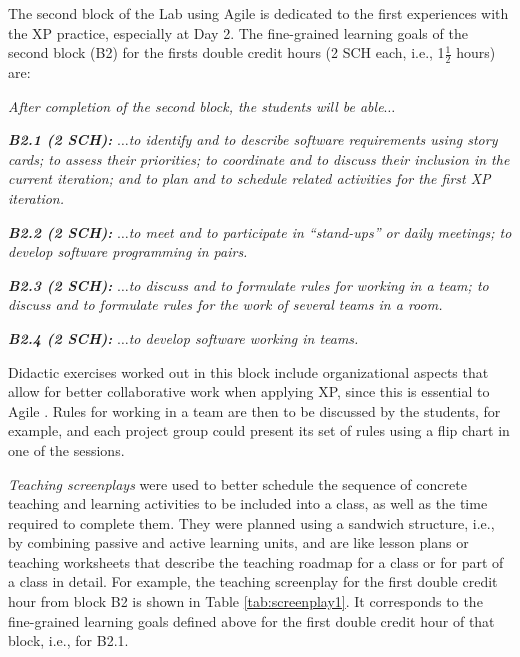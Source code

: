 \documentclass[conference]{IEEEtran}
\begin{document}
The second block of the Lab using Agile is dedicated to the first experiences with the XP practice, especially at Day 2. The fine-grained learning goals of the second block (B2) for the firsts double credit hours (2 SCH each, i.e., 1$\frac{1}{2}$ hours) are: 

\textit{After completion of the second block, the students will be able$\dots$ }

\textit{\bfseries B2.1 (2 SCH):} $\dots$\textit{to identify and to describe software requirements using story cards; to assess their priorities; to coordinate and to discuss their inclusion in the current iteration; and to plan and to schedule related activities for the first XP iteration.}

\textit{\bfseries B2.2 (2 SCH):} $\dots$\textit{to meet and to participate in ``stand-ups'' or daily meetings; to develop software programming in pairs.}

\textit{\bfseries B2.3 (2 SCH):} $\dots$\textit{to discuss and to formulate rules for working in a team; to discuss and to formulate rules for the work of several teams in a room.}

\textit{\bfseries B2.4 (2 SCH):} $\dots$\textit{to develop software working in teams.}

Didactic exercises worked out in this block include organizational aspects that allow for better collaborative work when applying XP, since this is essential to Agile \cite{Beetal01}. Rules for working in a team are then to be discussed by the students, for example, and each project group could present its set of rules using a flip chart in one of the sessions.

\textit{Teaching screenplays} were used to better schedule the sequence of concrete teaching and learning activities to be included into a class, as well as the time required to complete them. They were planned using a sandwich structure, i.e., by combining passive and active learning units, and are like lesson plans or teaching worksheets that describe the teaching roadmap for a class or for part of a class in detail. For example, the teaching screenplay for the first double credit hour from block B2 is shown in Table \ref{tab:screenplay1}. It corresponds to the fine-grained learning goals defined above for the first double credit hour of that block, i.e., for B2.1.
\end{document}
